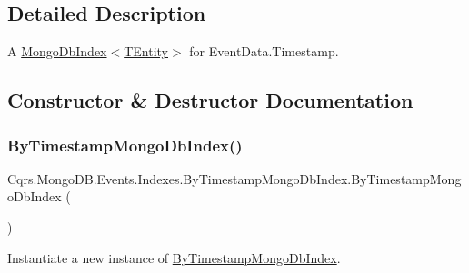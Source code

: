 \subsection{Detailed Description}
A \hyperlink{classCqrs_1_1MongoDB_1_1DataStores_1_1Indexes_1_1MongoDbIndex_a61f4b17dd968f92e81562c70ae062a89_a61f4b17dd968f92e81562c70ae062a89}{Mongo\+Db\+Index$<$\+T\+Entity$>$} for Event\+Data.\+Timestamp. 



\subsection{Constructor \& Destructor Documentation}
\mbox{\label{classCqrs_1_1MongoDB_1_1Events_1_1Indexes_1_1ByTimestampMongoDbIndex_a642c97e253eaa259cb64b627701540c0_a642c97e253eaa259cb64b627701540c0}} 
\subsubsection{\texorpdfstring{By\+Timestamp\+Mongo\+Db\+Index()}{ByTimestampMongoDbIndex()}}
{\footnotesize\ttfamily Cqrs.\+Mongo\+D\+B.\+Events.\+Indexes.\+By\+Timestamp\+Mongo\+Db\+Index.\+By\+Timestamp\+Mongo\+Db\+Index (\begin{DoxyParamCaption}{ }\end{DoxyParamCaption})}



Instantiate a new instance of \hyperlink{classCqrs_1_1MongoDB_1_1Events_1_1Indexes_1_1ByTimestampMongoDbIndex}{By\+Timestamp\+Mongo\+Db\+Index}. 

